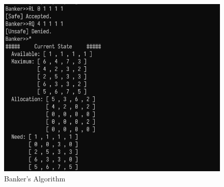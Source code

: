 \documentclass[UTF8,10pt,a4paper]{article}
\theoremstyle{Problem}
\theoremstyle{Solution}
\begin{document}
\begin{figure}[H]
    \centering
    \includegraphics[width=400pt]{3.png}
    \caption{Banker's Algorithm}
    \label{3}
\end{figure}
\end{document}
